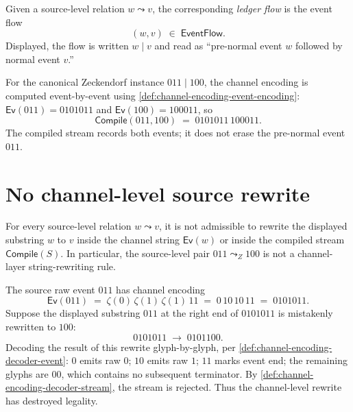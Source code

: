 \begin{definition}
\label{def:source-channel-carry-ledger}
Given a source-level relation $w \leadsto v$, the corresponding \emph{ledger flow} is the event flow
$$
  (w, v) \;\in\; \mathsf{EventFlow}.
$$
Displayed, the flow is written $w \mid v$ and read as ``pre-normal event $w$ followed by normal event $v$.''

For the canonical Zeckendorf instance $011 \mid 100$, the channel encoding is computed event-by-event using \autoref{def:channel-encoding-event-encoding}: $\mathsf{Ev}(011) = 0101011$ and $\mathsf{Ev}(100) = 100011$, so
$$
  \mathsf{Compile}(011, 100) \;=\; 0101011\,100011.
$$
The compiled stream records both events; it does not erase the pre-normal event $011$.
\end{definition}

\section{No channel-level source rewrite}
\label{sec:source-channel-no-channel-rewrite}

\begin{principle}
\label{prin:source-channel-no-channel-rewrite}
For every source-level relation $w \leadsto v$, it is not admissible to rewrite the displayed substring $w$ to $v$ inside the channel string $\mathsf{Ev}(w)$ or inside the compiled stream $\mathsf{Compile}(S)$. In particular, the source-level pair $011 \leadsto_{Z} 100$ is not a channel-layer string-rewriting rule.
\end{principle}

\begin{example}
\label{ex:source-channel-rewrite-breaks-legality}
The source raw event $011$ has channel encoding
$$
  \mathsf{Ev}(011)
  \;=\; \zeta(0)\,\zeta(1)\,\zeta(1)\,11
  \;=\; 0\,10\,10\,11
  \;=\; 0101011.
$$
Suppose the displayed substring $011$ at the right end of $0101011$ is mistakenly rewritten to $100$:
$$
  0101011 \;\longrightarrow\; 0101100.
$$
Decoding the result of this rewrite glyph-by-glyph, per \autoref{def:channel-encoding-decoder-event}: $0$ emits raw $0$; $10$ emits raw $1$; $11$ marks event end; the remaining glyphs are $00$, which contains no subsequent terminator. By \autoref{def:channel-encoding-decoder-stream}, the stream is rejected. Thus the channel-level rewrite has destroyed legality.
\end{example}

